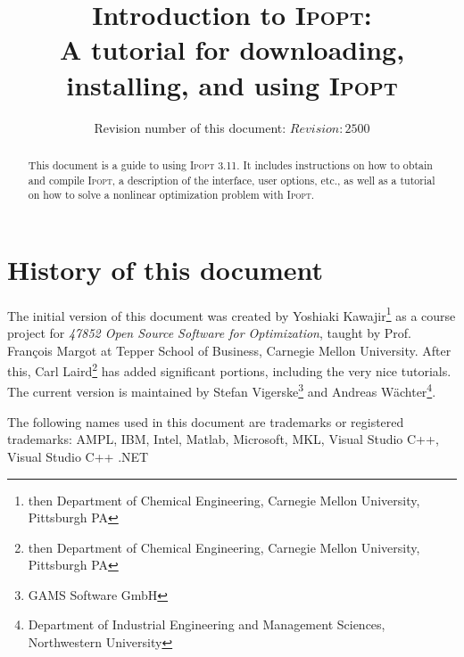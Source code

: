 \documentclass[10pt]{article}
\newcommand{\Ipopt}{\textsc{Ipopt}\xspace}
\begin{document}
\title{Introduction to \Ipopt:\\
A tutorial for downloading, installing, and using \Ipopt}

\author{Revision number of this document: $Revision: 2500 $}

\maketitle

\begin{abstract}
  This document is a guide to using \Ipopt 3.11.  It includes
  instructions on how to obtain and compile \Ipopt, a description of
  the interface, user options, etc., as well as a tutorial on how to
  solve a nonlinear optimization problem with \Ipopt.
\end{abstract}

\section*{History of this document}
The initial version of this document was created by Yoshiaki
Kawajir\footnote{then Department of Chemical Engineering, Carnegie Mellon
  University, Pittsburgh PA} as a course project for \textit{47852
  Open Source Software for Optimization}, taught by Prof. Fran\c{c}ois
Margot at Tepper School of Business, Carnegie Mellon University.
After this, Carl Laird\footnote{then Department of Chemical
  Engineering, Carnegie Mellon University, Pittsburgh PA} has added
significant portions, including the very nice tutorials.  The current
version is maintained by Stefan Vigerske\footnote{GAMS Software GmbH} and
  Andreas W\"achter\footnote{Department of Industrial Engineering and
  Management Sciences, Northwestern University}.

\tableofcontents

\vspace{\baselineskip}
\begin{small}
\noindent
The following names used in this document are trademarks or registered
trademarks: AMPL, IBM, Intel, Matlab, Microsoft, MKL, Visual Studio C++,
Visual Studio C++ .NET
\end{small}
\end{document}
